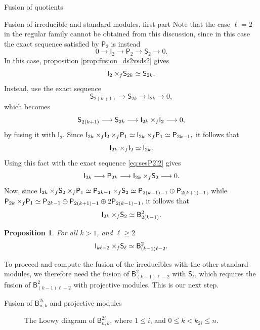 \documentclass[reqno]{amsart}
\newtheorem{Prop}[Thm]{Proposition}
\newcommand{\ds}[1]{\mathsf S_{#1}}
\newcommand{\dl}[1]{\mathsf I_{#1}}
\newcommand{\dP}[1]{\mathsf P_{#1}}
\newcommand{\xf}{\times\hspace{-0.27em}_f}
\newcommand{\B}[2]{\mathsf{B}^{#1}_{#2}}
\newcommand{\lc}{\ell}
\begin{document}
\begin{section}{Fusion of quotients}
\begin{subsection}{Fusion of irreducible and standard modules, first part}
Note that the case $\lc=2$ in the regular family cannot be obtained from this discussion, since in this case the exact sequence satisfied by $\dP{2}$ is instead
\begin{equation}\label{eq:sesP2l2}
 0 \longrightarrow \dl{2} \longrightarrow \dP{2} \longrightarrow \ds{2} \longrightarrow 0. 
\end{equation}
In this case, proposition \ref{prop:fusion_ds2vsds2} gives
$$\dl{2} \xf \ds{2k} \simeq \ds{2 k}.$$ Instead, use the exact sequence 
$$ \ds{2(k+1)} \longrightarrow \ds{2k} \longrightarrow \dl{2k} \longrightarrow 0, $$ which becomes 
\begin{equation}
\ds{2(k+1)} \longrightarrow \ds{2k} \longrightarrow \dl{2k} \xf \dl{2} \longrightarrow 0,
\end{equation}
by fusing it with $\dl{2}$. Since $\dl{2k}\xf\dl{2} \xf \dP{1} \simeq \dl{2k} \xf \dP{1} \simeq \dP{2k-1}, $ it follows that $$\dl{2k} \xf \dl{2} \simeq \dl{2k}. $$ Using this fact with the exact sequence \eqref{eq:sesP2l2} gives
\begin{equation}
\dl{2k} \longrightarrow \dP{2k} \longrightarrow \dl{2k} \xf \ds{2} \longrightarrow 0.
\end{equation}
Now, since $\dl{2k}\xf\ds{2} \xf \dP{1} \simeq \dP{2k -1 } \xf \ds{2} \simeq \dP{2(k-1) -1} \oplus \dP{2(k +1)-1} $, while $\dP{2k} \xf \dP{1} \simeq \dP{2k-1} \oplus \dP{2(k+1) -1} \oplus 2 \dP{2(k-1)-1}$, it follows that $$\dl{2k} \xf \ds{2} \simeq \B{2}{2(k-1)}.$$
\begin{Prop}\label{prop:fusionIvsSl}
For all $k>1$, and $\ell \geq 2$
\begin{equation}
\dl{k \lc -2} \xf \ds{\lc} \simeq \B{2}{(k-1)\lc -2}.
\end{equation}
\end{Prop}
To proceed and compute the fusion of the irreducibles with the other standard modules, we therefore need the fusion of $\B{2}{(k-1)\lc-2}$ with $\ds{\lc}$, which requires the fusion of $\B{2}{(k-1)\lc-2}$ with projective modules. This is our next step.
\end{subsection}
\begin{subsection}{Fusion of $\B{2i}{n,k}$ and projective modules}\label{sec:fusionBvsP}
\begin{figure}[b]
\caption{The Loewy diagram of $\B{2i}{n,k}$, where $1 \leq i$, and $0\leq k<k_{2i}\leq n$.}\label{fig:Loewy.B2i}
\end{figure}
\end{subsection}
\end{section}
\end{document}
